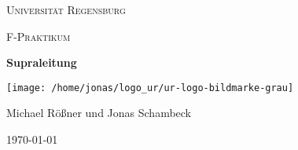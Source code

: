 \begin{titlepage}
	\centering
	{\scshape \LARGE Universität Regensburg \par}
	\vspace{1cm}
	{\scshape\Large F-Praktikum\par}
	\vspace{1.5cm}
	{\huge\bfseries Supraleitung\par}
	\vspace{2cm}
	\texttt{[image: /home/jonas/logo\_ur/ur-logo-bildmarke-grau]}\par
	\vfill
	{\large Michael Rößner und Jonas Schambeck\par}

	\vfill

	{\large \today\par}
\end{titlepage}
